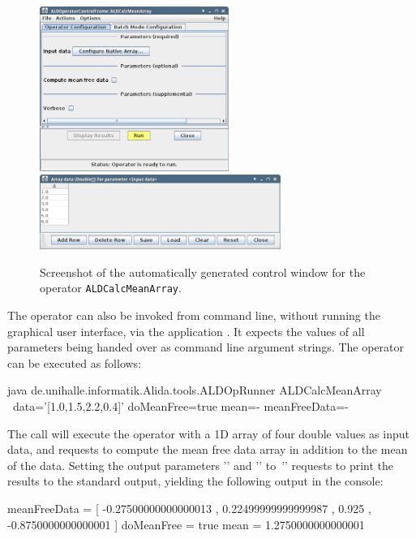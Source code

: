 \begin{center}
\begin{figure}[t]
\begin{center}
\hspace*{4cm}
\includegraphics[width=0.55\textwidth,clip,trim=0 0 0 0]
				{../images/screenShotALDCalcMeanArray}\\[-1cm]
\hspace*{-3cm}
\includegraphics[width=0.7\textwidth,clip,trim=0 0 0 0]
				{../images/screenShotALDCalcMeanArrayConfig}\\
\caption{\label{fig:calcMeanArrayGUI}Screenshot of the automatically generated
control window for the operator {\tt ALDCalcMeanArray}.}
\end{center}
\end{figure}
\end{center}

\vspace*{-0.5cm}
The operator  can also be invoked from command line,
without running the graphical user interface, via the application
. It expects the values of all parameters being handed over
as command line argument strings. The operator can be executed as follows:
\vspace*{0.5cm}
\begin{code}
    java de.unihalle.informatik.Alida.tools.ALDOpRunner ALDCalcMeanArray \
        data='[1.0,1.5,2.2,0.4]' doMeanFree=true mean=- meanFreeData=-
\end{code}

\newpage
The call will execute the operator with a 1D array of four double values as
input data, and requests to compute the mean free data array in addition to the
mean of the data.
Setting the output parameters '' and ''
to~'\icode{-}' requests to print the results to the standard output, 
yielding the following output in the console:
\vspace*{0.5cm}
\begin{code}
  meanFreeData = [ -0.27500000000000013 , 0.22499999999999987 , 
                     0.925 , -0.8750000000000001 ]
  doMeanFree = true
  mean = 1.2750000000000001
\end{code}
\vspace*{-0.25cm}